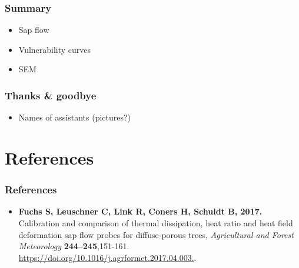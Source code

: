 \documentclass[usepdftitle=false]{beamer}
\begin{document}
\begin{frame}
	\frametitle{Summary}
	\begin{itemize}
		\item Sap flow
		\item Vulnerability curves
		\item SEM
	\end{itemize}
\end{frame}


\begin{frame}
	\frametitle{Thanks \& goodbye}
	\begin{itemize}
		\item Names of assistants (pictures?)
	\end{itemize}
\end{frame}

\section{References}
\begin{frame}
	\frametitle{References}
	\begin{itemize}
		\item \textbf{Fuchs S, Leuschner C, Link R, Coners H, Schuldt B, 2017.}
		Calibration and comparison of thermal dissipation, heat ratio and heat field deformation sap flow probes for diffuse-porous trees,
		\textit{Agricultural and Forest Meteorology} \textbf{244–245},151-161. \url{https://doi.org/10.1016/j.agrformet.2017.04.003.}.
	\end{itemize}
\end{frame}
\end{document}
